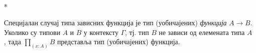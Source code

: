 \documentclass[12pt,oneside]{memoir}
\begin{document}
\begin{samepage}
    \begin{center}
    \begin{minipage}{0.3\textwidth}
        \begin{prooftree}
        \end{prooftree}
    \end{minipage}
    \begin{minipage}{0.35\textwidth}
        \begin{prooftree}
        \end{prooftree}
    \end{minipage}
    \begin{minipage}{0.3\textwidth}
        \begin{prooftree}
        \end{prooftree}
    \end{minipage}
    \\*
    \bigskip%
    \begin{minipage}{0.4\textwidth}
        \begin{prooftree}
        \end{prooftree}
    \end{minipage}
    \begin{minipage}{0.4\textwidth}
        \begin{prooftree}
        \end{prooftree}
    \end{minipage}
    \end{center}
\end{samepage}

Специјалан случај типа зависних функција је тип (уобичајених) \emph{функција} $A \to B$. Уколико су типови $A$ и $B$ у контексту $\Gamma$, тј. тип $B$ не зависи од елемената типа $A$, тада $\prod_{(x:A)} B$ представља тип (уобичајених) функција. 
\end{document}
